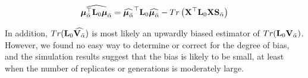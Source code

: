 \documentclass[12pt]{article}
\begin{document}
\begin{bibunit}
\begin{equation} 
\widehat{\boldsymbol{\mu}_{\bar{\alpha}}^{\top}{\bf L}_0\boldsymbol{\mu}_{\bar{\alpha}}}= \widehat{\boldsymbol{\mu}_{\bar{\alpha}}}^{\top}{\bf L}_0\widehat{\boldsymbol{\mu}_{\bar{\alpha}}}-Tr\left({\bf X}^{\top}{\bf L}_0{\bf X}{\bf S}_{\bar{\alpha}}\right)
\end{equation} 

In addition, $Tr({\bf L}_0\widehat{{\bf V}_{\bar \alpha}})$ is most likely an upwardly biased estimator of $Tr({\bf L}_0{\bf V}_{\bar \alpha})$. However, we found no easy way to determine or correct for the degree of bias, and the simulation results suggest that the bias is likely to be small, at least when the number of replicates or generations is moderately large.\\







\end{bibunit}
\end{document}
